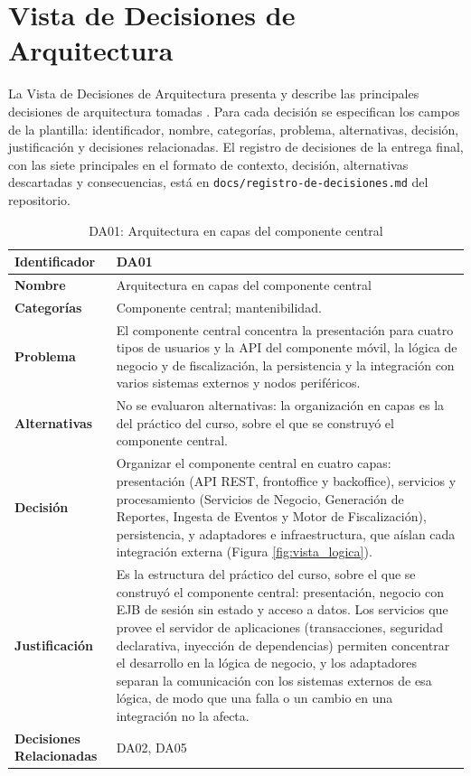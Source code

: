 \section{Vista de Decisiones de Arquitectura}\label{sec:vista-de-decisiones-de-arquitectura}

La Vista de Decisiones de Arquitectura presenta y describe las principales decisiones de arquitectura tomadas \cite{VanHeesch2012}\cite{Kruchten2009}. Para cada decisión se especifican los campos de la plantilla: identificador, nombre, categorías, problema, alternativas, decisión, justificación y decisiones relacionadas. El registro de decisiones de la entrega final, con las siete principales en el formato de contexto, decisión, alternativas descartadas y consecuencias, está en \texttt{docs/registro-de-decisiones.md} del repositorio.


\begin{table}[H]
    \small
    \centering
    \caption{DA01: Arquitectura en capas del componente central}
    \label{tab:da01}
    \begin{tabular}{|p{4.1cm}|p{11.7cm}|}
        \hline
            \textbf{Identificador} & DA01 \\
        \hline
            \textbf{Nombre} & Arquitectura en capas del componente central \\
        \hline
            \textbf{Categorías} & Componente central; mantenibilidad. \\
        \hline
            \textbf{Problema} & El componente central concentra la presentación para cuatro tipos de usuarios y la API del componente móvil, la lógica de negocio y de fiscalización, la persistencia y la integración con varios sistemas externos y nodos periféricos. \\
        \hline
            \textbf{Alternativas} & No se evaluaron alternativas: la organización en capas es la del práctico del curso, sobre el que se construyó el componente central. \\
        \hline
            \textbf{Decisión} & Organizar el componente central en cuatro capas: presentación (API REST, frontoffice y backoffice), servicios y procesamiento (Servicios de Negocio, Generación de Reportes, Ingesta de Eventos y Motor de Fiscalización), persistencia, y adaptadores e infraestructura, que aíslan cada integración externa (Figura \ref{fig:vista_logica}). \\
        \hline
            \textbf{Justificación} & Es la estructura del práctico del curso, sobre el que se construyó el componente central: presentación, negocio con EJB de sesión sin estado y acceso a datos. Los servicios que provee el servidor de aplicaciones (transacciones, seguridad declarativa, inyección de dependencias) permiten concentrar el desarrollo en la lógica de negocio, y los adaptadores separan la comunicación con los sistemas externos de esa lógica, de modo que una falla o un cambio en una integración no la afecta. \\
        \hline
            \textbf{Decisiones Relacionadas} & DA02, DA05 \\
        \hline
    \end{tabular}
\end{table}

